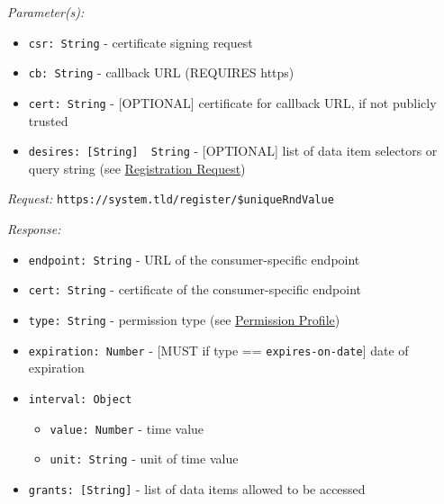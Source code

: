 \documentclass[12pt,english,a4paper,titlepage,cleardoublepage=empty,dottedtoc]{report}
\newenvironment{Shaded}{\begin{snugshade}}{\end{snugshade}}
\newcommand{\DataTypeTok}[1]{\textcolor[rgb]{0.13,0.29,0.53}{#1}}
\newcommand{\StringTok}[1]{\textcolor[rgb]{0.31,0.60,0.02}{#1}}
\newcommand{\OtherTok}[1]{\textcolor[rgb]{0.56,0.35,0.01}{#1}}
\newcommand{\FunctionTok}[1]{\textcolor[rgb]{0.00,0.00,0.00}{#1}}
\providecommand{\tightlist}{%
  \setlength{\itemsep}{0pt}\setlength{\parskip}{0pt}}
\begin{document}
\emph{Parameter(s):}

\begin{itemize}
\tightlist
\item
  \texttt{csr:\ String} - certificate signing request
\item
  \texttt{cb:\ String} - callback URL (REQUIRES https)
\item
  \texttt{cert:\ String} - {[}OPTIONAL{]} certificate for callback URL,
  if not publicly trusted
\item
  \texttt{desires:\ {[}String{]}\ \textbar{}\textbar{}\ String} -
  {[}OPTIONAL{]} list of data item selectors or query string (see
  \protect\hyperlink{spec_api_permission-request}{Registration Request})
\end{itemize}

\emph{Request:} \texttt{https://system.tld/register/\$uniqueRndValue}

\begin{Shaded}
\end{Shaded}

\emph{Response:}

\begin{itemize}
\tightlist
\item
  \texttt{endpoint:\ String} - URL of the consumer-specific endpoint
\item
  \texttt{cert:\ String} - certificate of the consumer-specific endpoint
\item
  \texttt{type:\ String} - permission type (see
  \protect\hyperlink{permission-profile}{Permission Profile})
\item
  \texttt{expiration:\ Number} - {[}MUST if type ==
  \texttt{expires-on-date\textquotesingle{}}{]} date of expiration
\item
  \texttt{interval:\ Object}

  \begin{itemize}
  \tightlist
  \item
    \texttt{value:\ Number} - time value
  \item
    \texttt{unit:\ String} - unit of time value
  \end{itemize}
\item
  \texttt{grants:\ {[}String{]}} - list of data items allowed to be
  accessed
\end{itemize}
\end{document}
